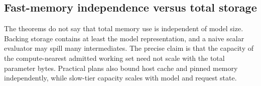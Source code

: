 \subsection{Fast-memory independence versus total storage}

The theorems do not say that total memory use is independent of model size. Backing storage contains at least the model representation, and a naive scalar evaluator may spill many intermediates. The precise claim is that the capacity of the compute-nearest admitted working set need not scale with the total parameter bytes. Practical plans also bound host cache and pinned memory independently, while slow-tier capacity scales with model and request state.
